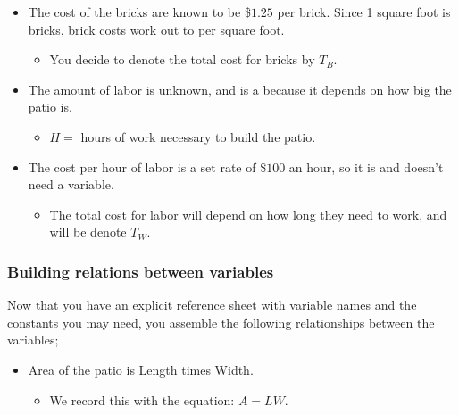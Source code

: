 \documentclass{ximera}
\begin{document}
\begin{example}
\begin{itemize}
            \item The cost of the bricks are known to be \$$1.25$ per brick. Since 1 square foot is  bricks, brick costs work out to  per square foot.
            
            \begin{itemize}
                \item You decide to denote the total cost for bricks by $T_B$.
            \end{itemize}
            
            \item The amount of labor is unknown, and is a  because it depends on how big the patio is.
            
            \begin{itemize}
            \item $H =$ hours of work necessary to build the patio.
            \end{itemize}
            
            \item The cost per hour of labor is a set rate of \$$100$ an hour, so it is  and doesn't need a variable.
            
            \begin{itemize}
                \item The total cost for labor will depend on how long they need to work, and will be denote $T_W$.
            \end{itemize}
        \end{itemize}
    
    \subsubsection*{Building relations between variables}
        Now that you have an explicit reference sheet with variable names and the constants you may need, you assemble the following relationships between the variables;
        
        \begin{itemize}
            \item Area of the patio is Length times Width.
            
            \begin{itemize}
                \item We record this with the equation: $A = LW$.
            \end{itemize}
            

\end{itemize}
\end{example}
\end{document}
